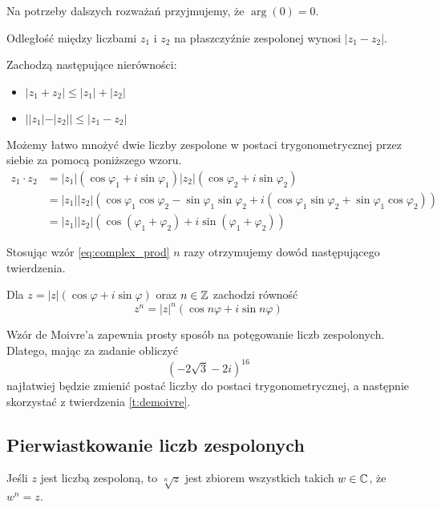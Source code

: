 \documentclass[11pt]{scrartcl}
\begin{document}
    Na potrzeby dalszych rozważań przyjmujemy, że $\arg(0) = 0$.

    \begin{fact}
        Odległość między liczbami $z_1$ i $z_2$ na płaszczyźnie zespolonej wynosi $|z_1 - z_2|$.
    \end{fact}

    \begin{lemma}
        Zachodzą następujące nierówności:
        \begin{itemize}
            \item $|z_1 + z_2| \leq |z_1| + |z_2|$
            \item $||z_1| - |z_2|| \leq |z_1 - z_2|$
        \end{itemize}
    \end{lemma}

    Możemy łatwo mnożyć dwie liczby zespolone w postaci trygonometrycznej przez siebie za pomocą poniższego wzoru.
    \begin{equation}
        \label{eq:complex_prod}
        \begin{aligned}
            z_1 \cdot z_2 &= |z_1|(\cos\varphi_1 + i\sin\varphi_1)|z_2|(\cos\varphi_2 + i\sin\varphi_2) \\
                          &= |z_1||z_2|(\cos\varphi_1\cos\varphi_2 - \sin\varphi_1\sin\varphi_2 + i(\cos\varphi_1\sin\varphi_2 + \sin\varphi_1\cos\varphi_2)) \\
                          &= |z_1||z_2|(\cos(\varphi_1 + \varphi_2) + i\sin(\varphi_1 + \varphi_2))
        \end{aligned}
    \end{equation}

    Stosując wzór \ref{eq:complex_prod} $n$ razy otrzymujemy dowód następującego twierdzenia.

    \begin{theorem}
        \label{t:demoivre}
        Dla $z = |z|(\cos\varphi + i\sin\varphi)$ oraz $n \in \mathbb Z$ zachodzi równość
        $$ z^n = |z|^n(\cos n\varphi + i\sin n\varphi) $$
    \end{theorem}

    Wzór de Moivre'a zapewnia prosty sposób na potęgowanie liczb zespolonych. Dlatego, mając za zadanie obliczyć
    $$ (-2\sqrt{3} - 2i)^{16} $$
    najłatwiej będzie zmienić postać liczby do postaci trygonometrycznej, a następnie skorzystać z twierdzenia \ref{t:demoivre}.

    \subsection{Pierwiastkowanie liczb zespolonych}
    \begin{definition}
        Jeśli $z$ jest liczbą zespoloną, to $\sqrt[n]{z}$ jest zbiorem wszystkich takich $w \in \mathbb C$, że $w^n = z$.
    \end{definition}
\end{document}

